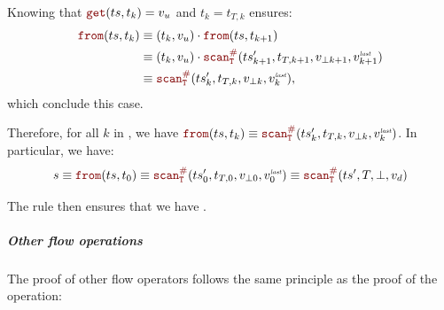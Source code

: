 \begin{skippableproof}
\begin{itemize}
\begin{itemize}
                        Knowing that $\getAt{\ts}{t_k} = v_u$ and $t_k = t_{T, k}$ ensures:
                        \begin{align*}
                            \from{\ts}{t_k} & \equiv (t_k, v_u) \next \from{\ts}{t_{k+1}}                                                 \\
                                            & \equiv (t_k, v_u) \next \scanAux{\ts'_{k+1}}{T}{t_{T, k+1}}{v_{\bot k+1}}{v^\explast_{k+1}} \\
                                            & \equiv \scanAux{\ts'_k}{T}{t_{T, k}}{v_{\bot k}}{v^\explast_k},
                        \end{align*}
                        which conclude this case.
              \end{itemize}
    \end{itemize}
    Therefore, for all $k$ in \N, we have $\from{\ts}{t_k} \equiv \scanAux{\ts'_k}{T}{t_{T, k}}
        {v_{\bot k}}{v^\explast_k}$. In particular, we have:
    \begin{equation*}
        s \equiv \from{\ts}{t_0}
        \equiv \scanAux{\ts'_0}{T}{t_{T, 0}}{v_{\bot 0}}{v^\explast_0}
        \equiv \scanAux{\ts'}{T}{T}{\bot}{v_d}
    \end{equation*}

    The rule  then ensures that we have
    .

    \subparagraph{Other flow operations}

    The proof of other flow operators follows the same principle as the proof of the
     operation:


\end{skippableproof}
